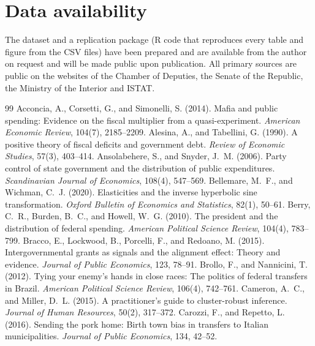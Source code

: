 \documentclass[12pt]{article}
\begin{document}
\section*{Data availability}\label{sec:avail}\sloppy
The dataset and a replication package (R code that reproduces every table and figure from the CSV files) have been prepared and are available from the author on request and will be made public upon publication. All primary sources are public on the websites of the Chamber of Deputies, the Senate of the Republic, the Ministry of the Interior and ISTAT.

\begin{thebibliography}{99}\small
{} Acconcia, A., Corsetti, G., and Simonelli, S. (2014). Mafia and public spending: Evidence on the fiscal multiplier from a quasi-experiment. \emph{American Economic Review}, 104(7), 2185--2209.
 Alesina, A., and Tabellini, G. (1990). A positive theory of fiscal deficits and government debt. \emph{Review of Economic Studies}, 57(3), 403--414.
 Ansolabehere, S., and Snyder, J.~M. (2006). Party control of state government and the distribution of public expenditures. \emph{Scandinavian Journal of Economics}, 108(4), 547--569.
 Bellemare, M.~F., and Wichman, C.~J. (2020). Elasticities and the inverse hyperbolic sine transformation. \emph{Oxford Bulletin of Economics and Statistics}, 82(1), 50--61.
 Berry, C.~R., Burden, B.~C., and Howell, W.~G. (2010). The president and the distribution of federal spending. \emph{American Political Science Review}, 104(4), 783--799.
 Bracco, E., Lockwood, B., Porcelli, F., and Redoano, M. (2015). Intergovernmental grants as signals and the alignment effect: Theory and evidence. \emph{Journal of Public Economics}, 123, 78--91.
 Brollo, F., and Nannicini, T. (2012). Tying your enemy's hands in close races: The politics of federal transfers in Brazil. \emph{American Political Science Review}, 106(4), 742--761.
 Cameron, A.~C., and Miller, D.~L. (2015). A practitioner's guide to cluster-robust inference. \emph{Journal of Human Resources}, 50(2), 317--372.
 Carozzi, F., and Repetto, L. (2016). Sending the pork home: Birth town bias in transfers to Italian municipalities. \emph{Journal of Public Economics}, 134, 42--52.

\end{thebibliography}
\end{document}
